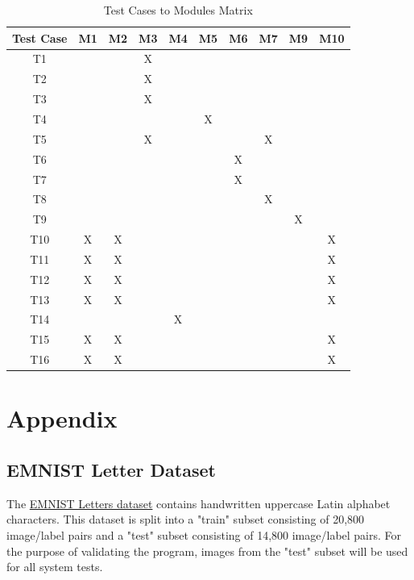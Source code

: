 \documentclass[12pt, titlepage]{article}
\begin{document}
\begin{table}[h]
\centering
\begin{tabular}{|c|c|c|c|c|c|c|c|c|c|}
\hline
\textbf{Test Case} & \textbf{M1} & \textbf{M2} & \textbf{M3} & \textbf{M4} & \textbf{M5} & \textbf{M6} & \textbf{M7} & \textbf{M9} & \textbf{M10} \\ \hline
T1 &  &  & X &  &  &  &  &  &  \\ \hline
T2 &  &  & X &  &  &  &  &  &  \\ \hline
T3 &  &  & X &  &  &  &  &  &  \\ \hline
T4 &  &  &  &  & X &  &  &  &  \\ \hline
T5 &  &  & X &  &  &  & X &  &  \\ \hline
T6 &  &  &  &  &  & X &  &  &  \\ \hline
T7 &  &  &  &  &  & X &  &  &  \\ \hline
T8 &  &  &  &  &  &  & X &  &  \\ \hline
T9 &  &  &  &  &  &  &  & X &  \\ \hline
T10 & X & X &  &  &  &  &  &  & X \\ \hline
T11 & X & X &  &  &  &  &  &  & X \\ \hline
T12 & X & X &  &  &  &  &  &  & X \\ \hline
T13 & X & X &  &  &  &  &  &  & X \\ \hline
T14 &  &  &  & X &  &  &  &  &  \\ \hline
T15 & X & X &  &  &  &  &  &  & X \\ \hline
T16 & X & X &  &  &  &  &  &  & X \\ \hline
\end{tabular}
\caption{Test Cases to Modules Matrix}
\label{tab:test-modules-matrix}
\end{table}





\newpage

\section{Appendix}

\subsection{EMNIST Letter Dataset}
\label{sec:EMNISTLetters}

The \href{https://www.tensorflow.org/datasets/catalog/emnist#emnistletters}{EMNIST Letters dataset} contains handwritten uppercase Latin alphabet
characters. This dataset is split into a "train" subset consisting of 20,800
image/label pairs and a "test" subset consisting of 14,800 image/label pairs.
For the purpose of validating the \progname{} program, images from the "test"
subset will be used for all system tests.
\end{document}
